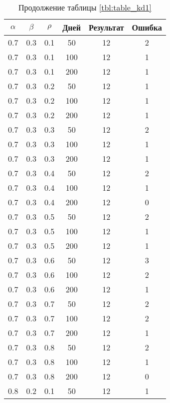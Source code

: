 \begin{table}[h]
	\begin{center}
        \captionsetup{justification=raggedright,singlelinecheck=off}
		\caption*{Продолжение таблицы \ref{tbl:table_kd1}}
		\begin{tabular}{|c|c|c|c|c|c|}
  	\hline
	$\alpha$ & $\beta$ & $\rho$ & Дней & Результат & Ошибка \\\hline
 
	0.7 &  0.3 &  0.1 &   50 &    12 &     2 \\
	0.7 &  0.3 &  0.1 &  100 &    12 &     1 \\
	0.7 &  0.3 &  0.1 &  200 &    12 &     1 \\
   \hline
	0.7 &  0.3 &  0.2 &   50 &    12 &     1 \\
	0.7 &  0.3 &  0.2 &  100 &    12 &     1 \\
	0.7 &  0.3 &  0.2 &  200 &    12 &     1 \\
   \hline
	0.7 &  0.3 &  0.3 &   50 &    12 &     2 \\
	0.7 &  0.3 &  0.3 &  100 &    12 &     1 \\
	0.7 &  0.3 &  0.3 &  200 &    12 &     1 \\
   \hline
	0.7 &  0.3 &  0.4 &   50 &    12 &     2 \\
	0.7 &  0.3 &  0.4 &  100 &    12 &     1 \\
	0.7 &  0.3 &  0.4 &  200 &    12 &     0 \\
   \hline
	0.7 &  0.3 &  0.5 &   50 &    12 &     2 \\
	0.7 &  0.3 &  0.5 &  100 &    12 &     1 \\
	0.7 &  0.3 &  0.5 &  200 &    12 &     1 \\
   \hline
	0.7 &  0.3 &  0.6 &   50 &    12 &     3 \\
	0.7 &  0.3 &  0.6 &  100 &    12 &     2 \\
	0.7 &  0.3 &  0.6 &  200 &    12 &     1 \\
   \hline
	0.7 &  0.3 &  0.7 &   50 &    12 &     2 \\
	0.7 &  0.3 &  0.7 &  100 &    12 &     2 \\
	0.7 &  0.3 &  0.7 &  200 &    12 &     1 \\
   \hline
	0.7 &  0.3 &  0.8 &   50 &    12 &     2 \\
	0.7 &  0.3 &  0.8 &  100 &    12 &     1 \\
	0.7 &  0.3 &  0.8 &  200 &    12 &     0 \\
   \hline
	0.8 &  0.2 &  0.1 &   50 &    12 &     1 \\

\end{tabular}
\end{center}
\end{table}
